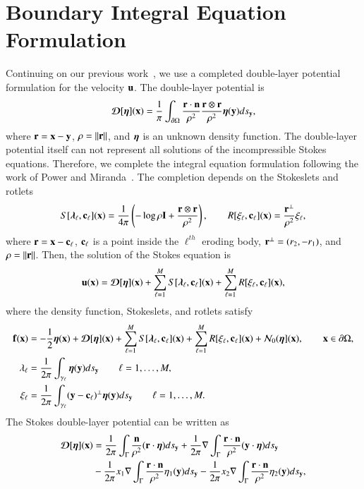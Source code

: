 \documentclass[preprint, 10pt]{elsarticle}
\begin{document}
\section{Boundary Integral Equation Formulation}
\label{s:formulation}
Continuing on our previous work~\cite{qua-moo2018}, we use a completed
double-layer potential formulation for the velocity ${\mathbf{u}}$.  The
double-layer potential is
\begin{align}
  {\boldsymbol{\mathcal D}}[{\boldsymbol\eta}]({\mathbf{x}}) = \frac{1}{\pi}\int_{{\partial}\Omega} 
    \frac{{\mathbf{r}} \cdot {\mathbf{n}}}{\rho^2} \frac{{\mathbf{r}} \otimes {\mathbf{r}}}{\rho^2}
    {\boldsymbol\eta}({\mathbf{y}}) ds_{\mathbf{y}},
\end{align}
where ${\mathbf{r}} = {\mathbf{x}} - {\mathbf{y}}$, $\rho = \|{\mathbf{r}}\|$, and ${\boldsymbol\eta}$ is an unknown
density function.  The double-layer potential itself can not represent
all solutions of the incompressible Stokes equations.  Therefore, we
complete the integral equation formulation following the work of Power
and Miranda~\cite{pow-mir1987}.  The completion depends on the
Stokeslets and rotlets
\begin{align}
  S[{\boldsymbol\lambda}_\ell,{\mathbf{c}}_\ell]({\mathbf{x}}) = \frac{1}{4\pi} \left( 
    -\log \rho {\mathbf{I}} + \frac{{\mathbf{r}} \otimes {\mathbf{r}}}{\rho^2} \right), \qquad
  R[\xi_\ell,{\mathbf{c}}_\ell]({\mathbf{x}}) = \frac{{\mathbf{r}}^\perp}{\rho^2} \xi_\ell,
\end{align}
where ${\mathbf{r}} = {\mathbf{x}} - {\mathbf{c}}_\ell$, ${\mathbf{c}}_\ell$ is a point inside the
$\ell^{th}$ eroding body, ${\mathbf{r}}^\perp = (r_2,-r_1)$, and $\rho =
\|{\mathbf{r}}\|$.  Then, the solution of the Stokes equation is
\begin{align}
  {\mathbf{u}}({\mathbf{x}}) = {\boldsymbol{\mathcal D}}[{\boldsymbol\eta}]({\mathbf{x}}) + 
    \sum_{\ell=1}^M S[{\boldsymbol\lambda}_\ell,{\mathbf{c}}_\ell]({\mathbf{x}}) + 
    \sum_{\ell=1}^M R[\xi_\ell,{\mathbf{c}}_\ell]({\mathbf{x}}),
\end{align}
where the density function, Stokeslets, and rotlets satisfy
\begin{align}
  {\mathbf{f}}({\mathbf{x}}) &= -\frac{1}{2}{\boldsymbol\eta}({\mathbf{x}}) + {\boldsymbol{\mathcal D}}[{\boldsymbol\eta}]({\mathbf{x}}) + 
    \sum_{\ell=1}^M S[{\boldsymbol\lambda}_\ell,{\mathbf{c}}_\ell]({\mathbf{x}}) + 
    \sum_{\ell=1}^M R[\xi_\ell,{\mathbf{c}}_\ell]({\mathbf{x}}) +
    {\mathcal{N}}_0({\boldsymbol\eta}]({\mathbf{x}}), \qquad {\mathbf{x}} \in {\partial}\Omega, \\
  \lambda_\ell &= \frac{1}{2\pi} \int_{\gamma_\ell} 
    {\boldsymbol\eta}({\mathbf{y}}) ds_{\mathbf{y}} \qquad \ell = 1,\ldots,M, \\
  \xi_\ell &= \frac{1}{2\pi} \int_{\gamma_\ell}
    ({\mathbf{y}} - {\mathbf{c}}_\ell)^\perp  {\boldsymbol\eta}({\mathbf{y}}) ds_{\mathbf{y}} 
    \qquad \ell = 1,\ldots,M.
\end{align}
The Stokes double-layer potential can be written as
\begin{align}
  {\boldsymbol{\mathcal D}}[{\boldsymbol\eta}]({\mathbf{x}}) &= 
    \frac{1}{2\pi} \int_{\Gamma} 
      \frac{{\mathbf{n}}}{\rho^2} ({\mathbf{r}} \cdot {\boldsymbol\eta}) ds_{\mathbf{y}} + 
    \frac{1}{2\pi} \nabla \int_{\Gamma}
      \frac{{\mathbf{r}} \cdot {\mathbf{n}}}{\rho^2} ({\mathbf{y}} \cdot {\boldsymbol\eta})ds_{\mathbf{y}} \\
    &- \frac{1}{2\pi} x_1 \nabla \int_{\Gamma}
      \frac{{\mathbf{r}} \cdot {\mathbf{n}}}{\rho^2}\eta_1({\mathbf{y}}) ds_{\mathbf{y}} -
    \frac{1}{2\pi} x_2 \nabla \int_{\Gamma}
      \frac{{\mathbf{r}} \cdot {\mathbf{n}}}{\rho^2}\eta_2({\mathbf{y}}) ds_{\mathbf{y}},
\end{align}
\end{document}
